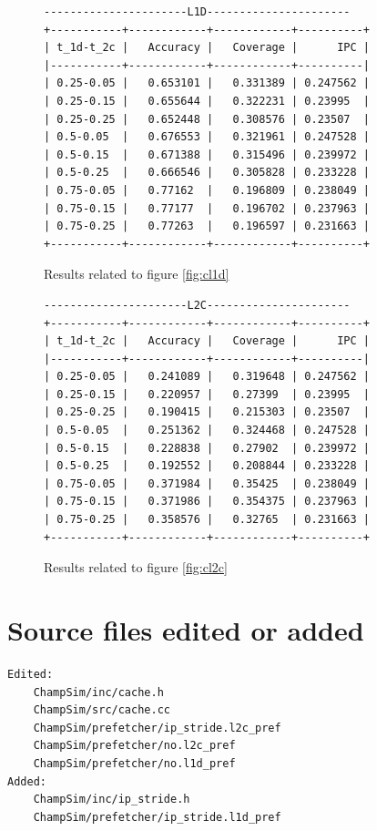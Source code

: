 \documentclass[11pt, swedish, openany]{book}
\begin{document}
\begin{figure}[H]
    \centering
    \begin{BVerbatim}
----------------------L1D----------------------
+-----------+------------+------------+----------+
| t_1d-t_2c |   Accuracy |   Coverage |      IPC |
|-----------+------------+------------+----------|
| 0.25-0.05 |   0.653101 |   0.331389 | 0.247562 |
| 0.25-0.15 |   0.655644 |   0.322231 | 0.23995  |
| 0.25-0.25 |   0.652448 |   0.308576 | 0.23507  |
| 0.5-0.05  |   0.676553 |   0.321961 | 0.247528 |
| 0.5-0.15  |   0.671388 |   0.315496 | 0.239972 |
| 0.5-0.25  |   0.666546 |   0.305828 | 0.233228 |
| 0.75-0.05 |   0.77162  |   0.196809 | 0.238049 |
| 0.75-0.15 |   0.77177  |   0.196702 | 0.237963 |
| 0.75-0.25 |   0.77263  |   0.196597 | 0.231663 |
+-----------+------------+------------+----------+
    \end{BVerbatim}
    \caption{Results related to figure \ref{fig:cl1d}}
\end{figure}

\begin{figure}[H]
    \centering
    \begin{BVerbatim}
----------------------L2C----------------------
+-----------+------------+------------+----------+
| t_1d-t_2c |   Accuracy |   Coverage |      IPC |
|-----------+------------+------------+----------|
| 0.25-0.05 |   0.241089 |   0.319648 | 0.247562 |
| 0.25-0.15 |   0.220957 |   0.27399  | 0.23995  |
| 0.25-0.25 |   0.190415 |   0.215303 | 0.23507  |
| 0.5-0.05  |   0.251362 |   0.324468 | 0.247528 |
| 0.5-0.15  |   0.228838 |   0.27902  | 0.239972 |
| 0.5-0.25  |   0.192552 |   0.208844 | 0.233228 |
| 0.75-0.05 |   0.371984 |   0.35425  | 0.238049 |
| 0.75-0.15 |   0.371986 |   0.354375 | 0.237963 |
| 0.75-0.25 |   0.358576 |   0.32765  | 0.231663 |
+-----------+------------+------------+----------+
    \end{BVerbatim}
    \caption{Results related to figure \ref{fig:cl2c}}
\end{figure}

\section{Source files edited or added}
\vspace{-0.8em}
\begin{verbatim}
Edited:
    ChampSim/inc/cache.h
    ChampSim/src/cache.cc
    ChampSim/prefetcher/ip_stride.l2c_pref
    ChampSim/prefetcher/no.l2c_pref
    ChampSim/prefetcher/no.l1d_pref
Added:
    ChampSim/inc/ip_stride.h
    ChampSim/prefetcher/ip_stride.l1d_pref
\end{verbatim}
\end{document}
